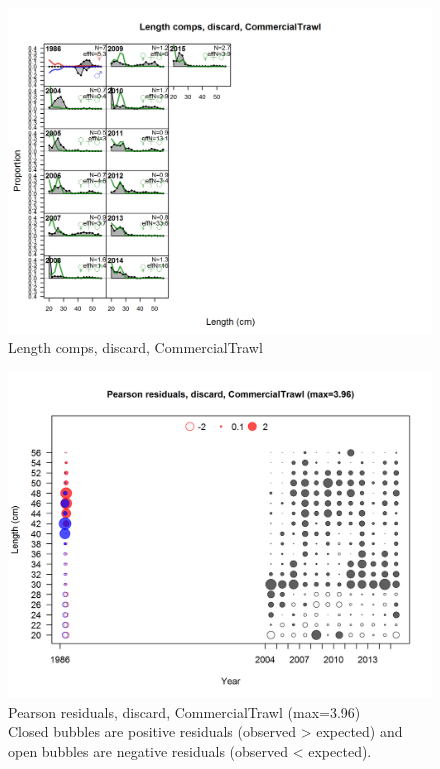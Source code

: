 \documentclass[12pt,]{article}
\begin{document}
\begin{figure}[htbp]
\centering
\includegraphics{./r4ss/plots_mod1/comp_lenfit_flt1mkt1.png}
\caption{Length comps, discard, CommercialTrawl
\label{fig:mod1_6_comp_lenfit_flt1mkt1}}
\end{figure}

\begin{figure}[htbp]
\centering
\includegraphics{./r4ss/plots_mod1/comp_lenfit_residsflt1mkt1.png}
\caption{Pearson residuals, discard, CommercialTrawl (max=3.96)\\
Closed bubbles are positive residuals (observed \textgreater{} expected)
and open bubbles are negative residuals (observed \textless{} expected).
\label{fig:mod1_7_comp_lenfit_residsflt1mkt1}}
\end{figure}
\end{document}
